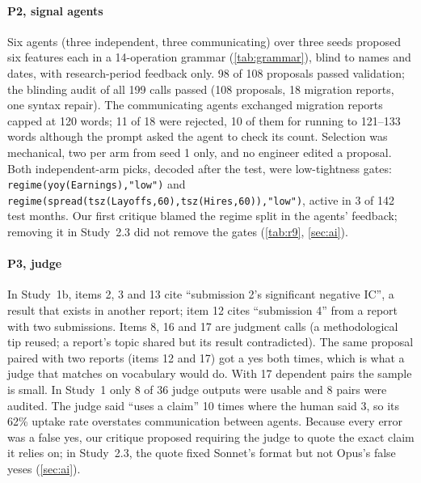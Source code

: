 \documentclass[11pt,letterpaper]{article}
\begin{document}
\paragraph{P2, signal agents} Six agents (three independent, three
communicating) over three seeds proposed six features each in a 14-operation
grammar (\cref{tab:grammar}), blind to names and dates, with research-period
feedback only. 98 of 108 proposals passed validation; the blinding audit of all
199 calls passed (108 proposals, 18 migration reports, one syntax repair). %
The communicating agents exchanged migration reports capped at 120 words; 11 of
18 were rejected, 10 of them for running to 121--133 words although the prompt
asked the agent to check its count. %
Selection was mechanical, two per arm from seed 1 only, and no engineer edited a
proposal. Both independent-arm picks, decoded after the test, were
low-tightness gates: \texttt{regime(yoy(Earnings),"low")} and
\texttt{regime(spread(tsz(Layoffs,60),tsz(Hires,60)),"low")}, active in 3 of 142
test months. %
Our first critique blamed the regime split in the agents' feedback; removing it
in Study~2.3 did not remove the gates (\cref{tab:r9}, \cref{sec:ai}).

\paragraph{P3, judge} In Study~1b, items 2, 3 and 13 cite ``submission 2's
significant negative IC'', a result that exists in another report; item 12 cites
``submission 4'' from a report with two submissions. Items 8, 16 and 17 are
judgment calls (a methodological tip reused; a report's topic shared but its
result contradicted). The same proposal paired with two reports (items 12 and
17) got a yes both times, which is what a judge that matches on vocabulary
would do. With 17 dependent pairs the sample is small. In Study~1 only 8 of 36
judge outputs were usable and 8 pairs were audited. The judge said ``uses a
claim'' 10 times where the human said 3, so its 62\% uptake rate overstates
communication between agents. %
Because every error was a false yes, our critique proposed requiring the judge to
quote the exact claim it relies on; in Study~2.3, the quote fixed Sonnet's format
but not Opus's false yeses (\cref{sec:ai}).
\end{document}
